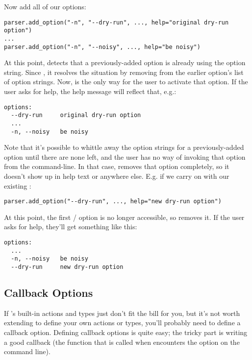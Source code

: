 Now add all of our options:

\begin{verbatim}
parser.add_option("-n", "--dry-run", ..., help="original dry-run option")
...
parser.add_option("-n", "--noisy", ..., help="be noisy")
\end{verbatim} 

At this point,  detects that a previously-added option is already
using the  option string.  Since , it resolves the situation by removing 
from the earlier option's list of option strings.  Now,
 is the only way for the user to activate that
option.  If the user asks for help, the help message will reflect
that, e.g.:

\begin{verbatim}
options:
  --dry-run     original dry-run option
  ...
  -n, --noisy   be noisy
\end{verbatim}

Note that it's possible to whittle away the option strings for a
previously-added option until there are none left, and the user has no
way of invoking that option from the command-line.  In that case,
 removes that option completely, so it doesn't show
up in help text or anywhere else.  E.g. if we carry on with our
existing :

\begin{verbatim}
parser.add_option("--dry-run", ..., help="new dry-run option")
\end{verbatim}

At this point, the first /
option is no longer accessible, so  removes it.  If
the user asks for help, they'll get something like this:

\begin{verbatim}
options:
  ...
  -n, --noisy   be noisy
  --dry-run     new dry-run option
\end{verbatim}

\subsection{Callback Options\label{optparse-callback-options}}

If 's built-in actions and types just don't fit the
bill for you, but it's not worth extending  to define
your own actions or types, you'll probably need to define a callback
option.  Defining callback options is quite easy; the tricky part is
writing a good callback (the function that is called when
 encounters the option on the command line).

